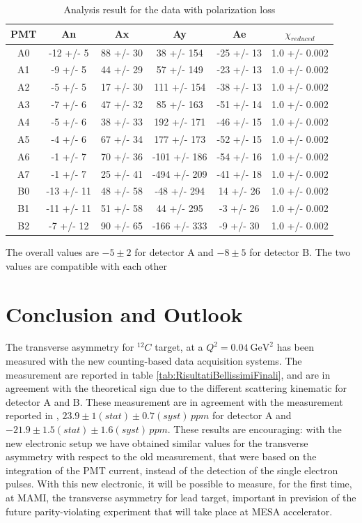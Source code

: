\begin{table}[h]
\centering
\begin{tabular}{c|c|c|c|c|c}
\hline
 PMT   & An         & Ax        & Ay           & Ae         & $\chi _{reduced}$   \\
\hline
 A0    & -12 +/- 5  & 88 +/- 30 & 38 +/- 154   & -25 +/- 13 & 1.0 +/- 0.002   \\
 A1    & -9 +/- 5   & 44 +/- 29 & 57 +/- 149   & -23 +/- 13 & 1.0 +/- 0.002   \\
 A2    & -5 +/- 5   & 17 +/- 30 & 111 +/- 154  & -38 +/- 13 & 1.0 +/- 0.002   \\
 A3    & -7 +/- 6   & 47 +/- 32 & 85 +/- 163   & -51 +/- 14 & 1.0 +/- 0.002   \\
 A4    & -5 +/- 6   & 38 +/- 33 & 192 +/- 171  & -46 +/- 15 & 1.0 +/- 0.002   \\
 A5    & -4 +/- 6   & 67 +/- 34 & 177 +/- 173  & -52 +/- 15 & 1.0 +/- 0.002   \\
 A6    & -1 +/- 7   & 70 +/- 36 & -101 +/- 186 & -54 +/- 16 & 1.0 +/- 0.002   \\
 A7    & -1 +/- 7   & 25 +/- 41 & -494 +/- 209 & -41 +/- 18 & 1.0 +/- 0.002   \\
 B0    & -13 +/- 11 & 48 +/- 58 & -48 +/- 294  & 14 +/- 26  & 1.0 +/- 0.002   \\
 B1    & -11 +/- 11 & 51 +/- 58 & 44 +/- 295   & -3 +/- 26  & 1.0 +/- 0.002   \\
 B2    & -7 +/- 12  & 90 +/- 65 & -166 +/- 333 & -9 +/- 30  & 1.0 +/- 0.002   \\
\hline
\end{tabular}
\caption{Analysis result for the data with polarization loss}
\label{tab:PolTab}
\end{table}

The overall values are $-5 \pm 2$ for detector A and $-8 \pm 5$ for detector B. The two values are compatible with each other

\section{Conclusion and Outlook} 

The transverse asymmetry for $^{12}C$ target, at a $Q^{2} = \SI{0.04}{\giga \electronvolt \squared}$ has been measured with the new counting-based data acquisition systems. The measurement are reported in table \ref{tab:RisultatiBellissimiFinali}, and are in agreement with the theoretical sign due to the different scattering kinematic for detector A and B. These measurement are in agreement with the measurement reported in \cite{Esser:2018vdp}, $23.9  \pm 1 (stat) \pm 0.7 (syst)  \, ppm$ for detector A and $ -21.9 \pm 1.5 (stat) \pm 1.6 (syst) \, ppm$.
These results are encouraging: with the new electronic setup we have obtained similar values for the transverse asymmetry with respect to the old measurement, that were based on the integration of the PMT current, instead of the detection of the single electron pulses. With this new electronic, it will be possible to measure, for the first time, at MAMI, the transverse asymmetry for lead target, important in prevision of the future parity-violating experiment that will take place at MESA accelerator.